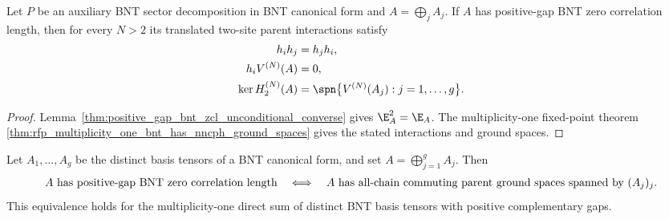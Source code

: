 \begin{lemma}
    \label{thm:positive_gap_bnt_zcl_unconditional_nncph}
    \leanok
    Let $P$ be an auxiliary BNT sector decomposition in BNT canonical form and
    $A=\bigoplus_j A_j$. If $A$ has positive-gap BNT zero correlation length,
    then for every $N>2$ its translated two-site parent interactions satisfy
    \begin{align}
        h_i h_j       & =h_j h_i,
        \notag                                                        \\
        h_iV^{(N)}(A) & =0,
        \notag                                                        \\
        \ker H_2^{(N)}(A)
                      & =\spn\bigl\{V^{(N)}(A_j):j=1,\ldots,g\bigr\}.
        \notag
    \end{align}
\end{lemma}
\begin{proof}\leanok
    Lemma~\ref{thm:positive_gap_bnt_zcl_unconditional_converse} gives
    $\E_A^2=\E_A$. The multiplicity-one fixed-point theorem
    \ref{thm:rfp_multiplicity_one_bnt_has_nncph_ground_spaces} gives the
    stated interactions and ground spaces.
\end{proof}

\begin{corollary}
    \label{thm:positive_gap_bnt_zcl_multiplicity_one_iff_nncph_ground_spaces}
    \leanok
    Let $A_1,\ldots,A_g$ be the distinct basis tensors of a BNT canonical
    form, and set $A=\bigoplus_{j=1}^g A_j$. Then
    \begin{align}
        A\text{ has positive-gap BNT zero correlation length}
        \quad\Longleftrightarrow\quad
        A\text{ has all-chain commuting parent ground spaces spanned by }(A_j)_j. \notag
    \end{align}
    This equivalence holds for the multiplicity-one direct sum of distinct BNT
    basis tensors with positive complementary gaps.
\end{corollary}

